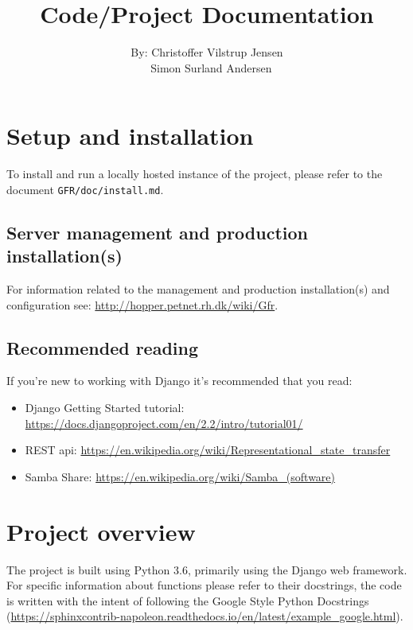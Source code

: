 \documentclass{article}
\title{Code/Project Documentation}
\author{By: Christoffer Vilstrup Jensen \\ $\ \ $ Simon Surland Andersen}
\begin{document}
\maketitle

\tableofcontents

\newpage

\section{Setup and installation}
To install and run a locally hosted instance of the project, please refer to the document \texttt{GFR/doc/install.md}.

\subsection{Server management and production installation(s)}
For information related to the management and production installation(s) and configuration see: \url{http://hopper.petnet.rh.dk/wiki/Gfr}.

\subsection{Recommended reading}
If you're new to working with Django it's recommended that you read:
\begin{itemize}
	\item Django Getting Started tutorial: \url{https://docs.djangoproject.com/en/2.2/intro/tutorial01/}
	\item REST api: \url{https://en.wikipedia.org/wiki/Representational_state_transfer}
	\item Samba Share: \url{https://en.wikipedia.org/wiki/Samba_(software)}
\end{itemize}

\section{Project overview}
The project is built using Python 3.6, primarily using the Django web framework. For specific information about functions please refer to their docstrings, the code is written with the intent of following the Google Style Python Docstrings (\url{https://sphinxcontrib-napoleon.readthedocs.io/en/latest/example_google.html}). \\
\end{document}
